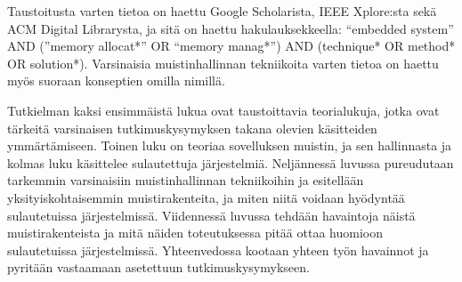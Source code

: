 Taustoitusta varten tietoa on haettu Google Scholarista, IEEE Xplore:sta sekä ACM Digital Librarysta, ja sitä on haettu hakulauksekkeella: “embedded system” AND (”memory allocat*” OR “memory manag*”) AND (technique* OR method* OR solution*). Varsinaisia muistinhallinnan tekniikoita varten tietoa on haettu myös suoraan konseptien omilla nimillä.

Tutkielman kaksi ensimmäistä lukua ovat taustoittavia teorialukuja, jotka ovat tärkeitä varsinaisen tutkimuskysymyksen takana olevien käsitteiden ymmärtämiseen. Toinen luku on teoriaa sovelluksen muistin, ja sen hallinnasta ja kolmas luku käsittelee sulautettuja järjestelmiä. Neljännessä luvussa pureudutaan tarkemmin varsinaisiin muistinhallinnan tekniikoihin ja esitellään yksityiskohtaisemmin muistirakenteita, ja miten niitä voidaan hyödyntää sulautetuissa järjestelmissä. Viidennessä luvussa tehdään havaintoja näistä muistirakenteista ja mitä näiden toteutuksessa pitää ottaa huomioon sulautetuissa järjestelmissä. Yhteenvedossa kootaan yhteen työn havainnot ja pyritään vastaamaan asetettuun tutkimuskysymykseen.